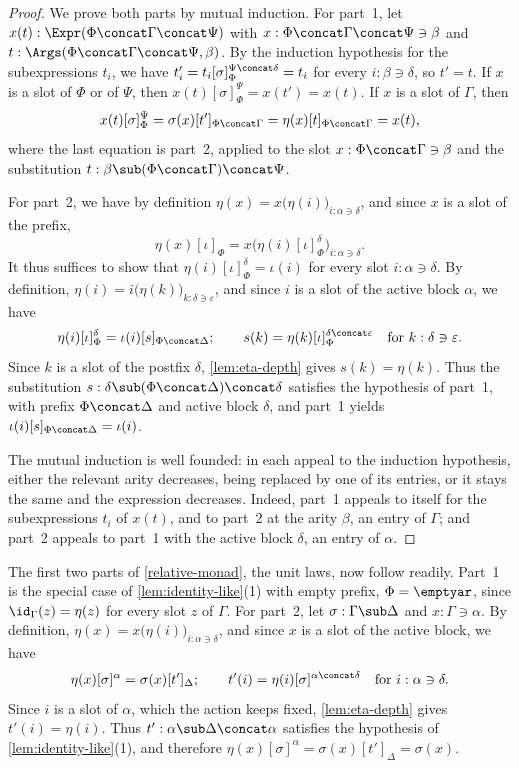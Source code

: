 \begin{proof}
    We prove both parts by mutual induction.
    For part~1, let $x(t) : \Expr(\Phi\concat\Gamma\concat\Psi)$ with $x : \Phi \concat \Gamma \concat \Psi \ni \beta$ and $t : \Args(\Phi \concat \Gamma \concat \Psi, \beta)$. By the induction hypothesis for the subexpressions $t_i$, we have $t'_i = t_i[\sigma]_\Phi^{\Psi \concat \delta} = t_i$ for every $i : \beta \ni \delta$, so $t' = t$. If $x$ is a slot of $\Phi$ or of $\Psi$, then $x(t)[\sigma]_\Phi^\Psi = x(t') = x(t)$. If $x$ is a slot of $\Gamma$, then
    \[
    x(t)[\sigma]_\Phi^\Psi = \sigma(x)[t']_{\Phi \concat \Gamma} = \eta(x)[t]_{\Phi \concat \Gamma} = x(t),
    \]
    where the last equation is part~2, applied to the slot $x : \Phi \concat \Gamma \ni \beta$ and the substitution $t : \beta \sub (\Phi \concat \Gamma) \concat \Psi$.

    For part~2, we have by definition $\eta(x) = x\big(\eta(i)\big)_{i : \alpha \ni \delta}$, and since $x$ is a slot of the prefix,
    \[
    \eta(x)[\iota]_\Phi = x\big(\eta(i)[\iota]_\Phi^\delta\big)_{i : \alpha \ni \delta}.
    \]
    It thus suffices to show that $\eta(i)[\iota]_\Phi^\delta = \iota(i)$ for every slot $i : \alpha \ni \delta$. By definition, $\eta(i) = i\big(\eta(k)\big)_{k : \delta \ni \varepsilon}$, and since $i$ is a slot of the active block $\alpha$, we have
    \[
    \eta(i)[\iota]_\Phi^\delta = \iota(i)[s]_{\Phi \concat \Delta}; \qquad s(k) = \eta(k)[\iota]_\Phi^{\delta \concat \varepsilon} \quad \text{for } k : \delta \ni \varepsilon.
    \]
    Since $k$ is a slot of the postfix $\delta$, \cref{lem:eta-depth} gives $s(k) = \eta(k)$. Thus the substitution $s : \delta \sub (\Phi \concat \Delta) \concat \delta$ satisfies the hypothesis of part~1, with prefix $\Phi \concat \Delta$ and active block $\delta$, and part~1 yields $\iota(i)[s]_{\Phi \concat \Delta} = \iota(i)$.

    The mutual induction is well founded: in each appeal to the induction hypothesis, either the relevant arity decreases, being replaced by one of its entries, or it stays the same and the expression decreases. Indeed, part~1 appeals to itself for the subexpressions $t_i$ of $x(t)$, and to part~2 at the arity $\beta$, an entry of $\Gamma$; and part~2 appeals to part~1 with the active block $\delta$, an entry of $\alpha$.
\end{proof}

The first two parts of \cref{relative-monad}, the unit laws, now follow readily. Part~1 is the special case of \cref{lem:identity-like}(1) with empty prefix, $\Phi = \emptyar$, since $\id_\Gamma(z) = \eta(z)$ for every slot $z$ of $\Gamma$. For part~2, let $\sigma : \Gamma \sub \Delta$ and $x : \Gamma \ni \alpha$. By definition, $\eta(x) = x\big(\eta(i)\big)_{i : \alpha \ni \delta}$, and since $x$ is a slot of the active block, we have
\[
\eta(x)[\sigma]^\alpha = \sigma(x)[t']_\Delta; \qquad t'(i) = \eta(i)[\sigma]^{\alpha \concat \delta} \quad \text{for } i : \alpha \ni \delta.
\]
Since $i$ is a slot of $\alpha$, which the action keeps fixed, \cref{lem:eta-depth} gives $t'(i) = \eta(i)$. Thus $t' : \alpha \sub \Delta \concat \alpha$ satisfies the hypothesis of \cref{lem:identity-like}(1), and therefore $\eta(x)[\sigma]^\alpha = \sigma(x)[t']_\Delta = \sigma(x)$.

